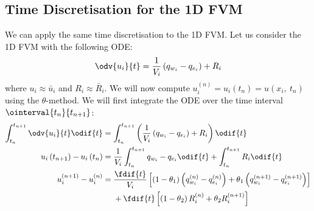 \documentclass{article}
\begin{document}
\subsection{Time Discretisation for the 1D FVM}
We can apply the same time discretisation to the 1D FVM. Let us
consider the 1D FVM with the following ODE:
\begin{equation*}
    \odv{u_i}{t} = \frac{1}{V_i} \left( q_{w_i} - q_{e_i} \right) + R_i
\end{equation*}
where \(u_i \approx \bar{u}_i\) and \(R_i \approx \bar{R}_i\). We will
now compute \(u_i^{\left( n \right)} = u_i\left( t_n \right) = u\left( x_i,\: t_n \right)\)
using the \(\theta\)-method. We will first integrate the ODE over the
time interval \(\ointerval{t_n}{t_{n+1}}\):
\begin{align*}
    \int_{t_n}^{t_{n+1}} \odv{u_i}{t} \odif{t}        & = \int_{t_n}^{t_{n+1}} \left( \frac{1}{V_i} \left( q_{w_i} - q_{e_i} \right) + R_i \right) \odif{t}                                                                                                                                                                                                              \\
    u_i\left( t_{n+1} \right) - u_i\left( t_n \right) & = \frac{1}{V_i} \int_{t_n}^{t_{n+1}} q_{w_i} - q_{e_i} \odif{t} + \int_{t_n}^{t_{n+1}} R_i \odif{t}                                                                                                                                                                                                              \\
    u_i^{\left( n+1 \right)} - u_i^{\left( n \right)} & = \begin{aligned}[t]
        &{}\frac{\fdif{t}}{V_i} \left[ \left( 1 - \theta_1 \right) \left( q_{w_i}^{\left( n \right)} - q_{e_i}^{\left( n \right)} \right) + \theta_1 \left( q_{w_i}^{\left( n+1 \right)} - q_{e_i}^{\left( n+1 \right)} \right) \right] \\
        &{}+ \fdif{t} \left[ \left( 1 - \theta_2 \right) R_i^{\left( n \right)} + \theta_2 R_i^{\left( n+1 \right)} \right]
    \end{aligned}
\end{align*}
\end{document}

